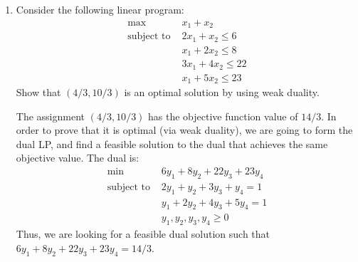\documentclass[11pt]{article}
\renewcommand{\geq}{\geqslant}
\begin{document}
\begin{enumerate}[1)]
\begin{solution}
\begin{enumerate}[i)]
\item Write $x = x^+ - x^-$ where $x^+, x^- \geq 0$. Then the original LP is equivalent to
\begin{align*}
\max \quad & c^T x^+ - c^T x^- \\
\text{subject to }& A x^+ - A x^- ≤ b \\
& x^+ ≥ 0 \\
& x^- ≥ 0
\end{align*}
where the constraint matrix is of full column rank.
\item The dual of the converted LP in i) is
\begin{align*}
\min \quad & (b\;\,0\;\,0)^T \begin{pmatrix}
y_1 \\ y_2 \\ y_3	
\end{pmatrix} \\
\text{subject to }& y_1^T A - y_2^T = c^T \\
& -y_1^T A - y_3^T = -c^T \\
& y_1 \in \R^m, y_2, y_3\in \R^n, y_1, y_2, y_3 ≥ 0
\end{align*}
\item Let $(y_1, y_2, y_3)^T$ be a feasible solution to the dual of the converted LP. By adding up the two constraints we get $y_2+y_3=0$. Since $y_2, y_3 ≥ 0$, we have $y_2 = y_3 = 0$. Thus $y_1^T A = c^T$ and $y_1$ is a feasible solution to the dual of the original LP.
\end{enumerate}
\end{solution}

\item Consider the following linear program:
\begin{align*}
\max \quad & x_1 + x_2 \\
\text{subject to }&2x_1 + x_2 ≤6 \\
&x_1 + 2x_2 ≤8 \\
& 3x_1 + 4x_2 ≤ 22\\
& x_1 + 5x_2 ≤ 23
\end{align*}
Show that $(4/3, 10/3)$ is an optimal solution by using weak duality.


\begin{solution}
The assignment $(4/3, 10/3)$ has the objective function value of $14/3$. In order to prove that it is
optimal (via weak duality), we are going to form the dual LP, and find a feasible solution to the
dual that achieves the same objective value. The dual is:
\begin{align}
\min  \quad & 6y_1 + 8y_2 + 22y_3 + 23y_4 \\
\text{subject to }& 2y_1 + y_2 + 3y_3 + y_4 = 1 \\
&y_1 + 2y_2 + 4y_3 + 5y_4 = 1\\
 & y_1, y_2, y_3, y_4 ≥0
\end{align}
Thus, we are looking for a feasible dual solution such that $6y_1 + 8y_2 + 22y_3 + 23y_4 = 14/3$. 


\end{solution}
\end{enumerate}
\end{document}
